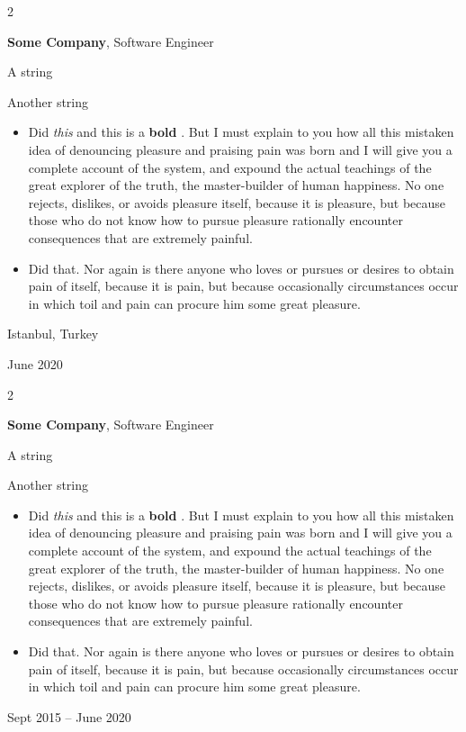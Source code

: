 \documentclass[10pt, letterpaper]{article}
\newenvironment{summary}{
    \begin{description}[
        topsep=0.10 cm,
        parsep=0.10 cm,
        partopsep=0pt,
        itemsep=0pt,
        leftmargin=0.4 cm + 10pt
    ]
}{
    \end{description}
} %
\newenvironment{highlights}{
    \begin{itemize}[
        topsep=0.10 cm,
        parsep=0.10 cm,
        partopsep=0pt,
        itemsep=0pt,
        leftmargin=0.4 cm + 10pt
    ]
}{
    \end{itemize}
} %
\newenvironment{twocolentry}[2][]{
    \onecolentry
    \def\secondColumn{#2}
    \setcolumnwidth{\fill, 4.5 cm}
    \begin{paracol}{2}
}{
    \switchcolumn \raggedleft \secondColumn
    \end{paracol}
    \endonecolentry
} %
\let\hrefWithoutArrow\href
\renewcommand{\href}[2]{\hrefWithoutArrow{#1}{\ifthenelse{\equal{#2}{}}{ }{#2 }\raisebox{.15ex}{\footnotesize \faExternalLink*}}}
\begin{document}
        \begin{twocolentry}{
            Istanbul, Turkey

        June 2020
        }
            \textbf{Some \textnormal{Company}}, Software Engineer
            \begin{summary}
                \item A string
                \item Another string
            \end{summary}
            \begin{highlights}
                \item Did \textit{this} and this is a \textbf{bold} \href{https://example.com}{link}. But I must explain to you how all this mistaken idea of denouncing pleasure and praising pain was born and I will give you a complete account of the system, and expound the actual teachings of the great explorer of the truth, the master-builder of human happiness. No one rejects, dislikes, or avoids pleasure itself, because it is pleasure, but because those who do not know how to pursue pleasure rationally encounter consequences that are extremely painful.
                \item Did that. Nor again is there anyone who loves or pursues or desires to obtain pain of itself, because it is pain, but because occasionally circumstances occur in which toil and pain can procure him some great pleasure.
            \end{highlights}
        \end{twocolentry}


        \vspace{0.2 cm}

        \begin{twocolentry}{
            Sept 2015 – June 2020
        }
            \textbf{Some \textnormal{Company}}, Software Engineer
            \begin{summary}
                \item A string
                \item Another string
            \end{summary}
            \begin{highlights}
                \item Did \textit{this} and this is a \textbf{bold} \href{https://example.com}{link}. But I must explain to you how all this mistaken idea of denouncing pleasure and praising pain was born and I will give you a complete account of the system, and expound the actual teachings of the great explorer of the truth, the master-builder of human happiness. No one rejects, dislikes, or avoids pleasure itself, because it is pleasure, but because those who do not know how to pursue pleasure rationally encounter consequences that are extremely painful.
                \item Did that. Nor again is there anyone who loves or pursues or desires to obtain pain of itself, because it is pain, but because occasionally circumstances occur in which toil and pain can procure him some great pleasure.
            \end{highlights}
        \end{twocolentry}
\end{document}
